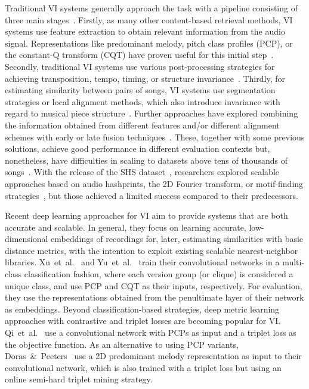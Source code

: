 \documentclass[letterpaper]{article}
\begin{document}
Traditional VI systems generally approach the task with a pipeline consisting of three main stages~\cite{osmalskyj2017}. Firstly, as many other content-based retrieval methods, VI systems use feature extraction to obtain relevant information from the audio signal. Representations like predominant melody, pitch class profiles (PCP), or the constant-Q transform (CQT) have proven useful for this initial step~\cite{marolt2006, kurth2008, humphrey2013}. Secondly, traditional VI systems use various post-processing strategies for achieving transposition, tempo, timing, or structure invariance~\cite{ellis2007, tsai2016, serra2009}. Thirdly, for estimating similarity between pairs of songs, VI systems use segmentation strategies or local alignment methods, which also introduce invariance with regard to musical piece structure~\cite{serra2009, gomez2006, tralie2017cover}. Further approaches have explored combining the information obtained from different features and/or different alignment schemes with early or late fusion techniques~\cite{foucard2010, tralie2017cover, chen2018}. These, together with some previous solutions, achieve good performance in different evaluation contexts but, nonetheless, have difficulties in scaling to datasets above tens of thousands of songs~\cite{yesiler2019}. With the release of the SHS dataset~\cite{millionsong}, researchers explored scalable approaches based on audio hashprints, the 2D Fourier transform, or motif-finding strategies~\cite{tsai2016, bertin2012, silva2016}, but those achieved a limited success compared to their predecessors.

Recent deep learning approaches for VI aim to provide systems that are both accurate and scalable. In general, they focus on learning accurate, low-dimensional embeddings of recordings for, later, estimating similarities with basic distance metrics, with the intention to exploit existing scalable nearest-neighbor libraries. Xu~et~al.~\cite{xu2018} and Yu~et~al.~\cite{yu2019} train their convolutional networks in a multi-class classification fashion, where each version group (or clique) is considered a unique class, and use PCP and CQT as their inputs, respectively. For evaluation, they use the representations obtained from the penultimate layer of their network as embeddings. Beyond classification-based strategies, deep metric learning approaches with contrastive and triplet losses are becoming popular for VI. Qi~et~al.~\cite{qi2018} use a convolutional network with PCPs as input and a triplet loss as the objective function. As an alternative to using PCP variants, Doras~\&~Peeters~\cite{doras2019} use a 2D predominant melody representation as input to their convolutional network, which is also trained with a triplet loss but using an online semi-hard triplet mining strategy.
\end{document}
